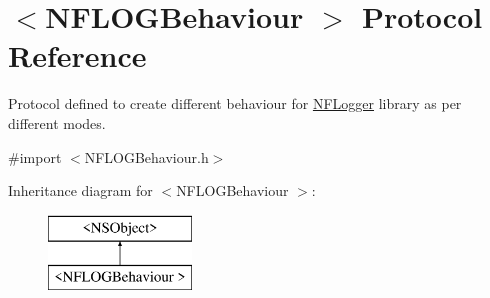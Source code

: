 \hypertarget{protocol_n_f_l_o_g_behaviour_01-p}{}\section{$<$N\+F\+L\+O\+G\+Behaviour $>$ Protocol Reference}
\label{protocol_n_f_l_o_g_behaviour_01-p}


Protocol defined to create different behaviour for \hyperlink{interface_n_f_logger}{N\+F\+Logger} library as per different modes.  




{\ttfamily \#import $<$N\+F\+L\+O\+G\+Behaviour.\+h$>$}

Inheritance diagram for $<$N\+F\+L\+O\+G\+Behaviour $>$\+:\begin{figure}[H]
\begin{center}
\leavevmode
\includegraphics[height=2.000000cm]{protocol_n_f_l_o_g_behaviour_01-p}
\end{center}
\end{figure}
